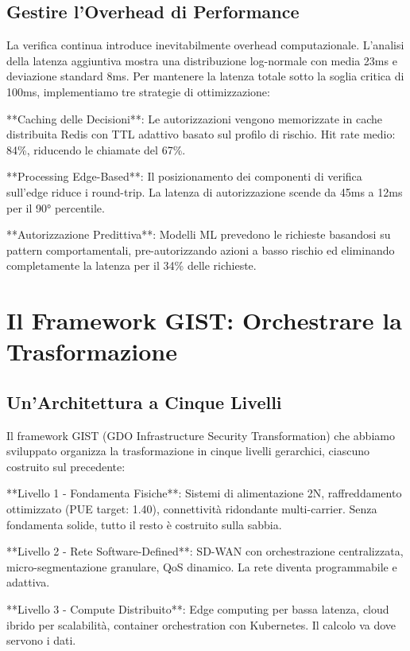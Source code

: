 \subsection{Gestire l'Overhead di Performance}

La verifica continua introduce inevitabilmente overhead computazionale. L'analisi della latenza aggiuntiva mostra una distribuzione log-normale con media 23ms e deviazione standard 8ms. Per mantenere la latenza totale sotto la soglia critica di 100ms, implementiamo tre strategie di ottimizzazione:

**Caching delle Decisioni**: Le autorizzazioni vengono memorizzate in cache distribuita Redis con TTL adattivo basato sul profilo di rischio. Hit rate medio: 84\%, riducendo le chiamate del 67\%.

**Processing Edge-Based**: Il posizionamento dei componenti di verifica sull'edge riduce i round-trip. La latenza di autorizzazione scende da 45ms a 12ms per il 90° percentile.

**Autorizzazione Predittiva**: Modelli ML prevedono le richieste basandosi su pattern comportamentali, pre-autorizzando azioni a basso rischio ed eliminando completamente la latenza per il 34\% delle richieste.

\section{Il Framework GIST: Orchestrare la Trasformazione}

\subsection{Un'Architettura a Cinque Livelli}

Il framework GIST (GDO Infrastructure Security Transformation) che abbiamo sviluppato organizza la trasformazione in cinque livelli gerarchici, ciascuno costruito sul precedente:

**Livello 1 - Fondamenta Fisiche**: Sistemi di alimentazione 2N, raffreddamento ottimizzato (PUE target: 1.40), connettività ridondante multi-carrier. Senza fondamenta solide, tutto il resto è costruito sulla sabbia.

**Livello 2 - Rete Software-Defined**: SD-WAN con orchestrazione centralizzata, micro-segmentazione granulare, QoS dinamico. La rete diventa programmabile e adattiva.

**Livello 3 - Compute Distribuito**: Edge computing per bassa latenza, cloud ibrido per scalabilità, container orchestration con Kubernetes. Il calcolo va dove servono i dati.

